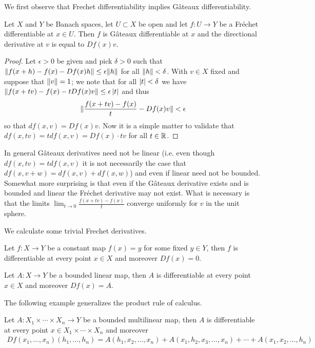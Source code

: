 We first observe that Frechet differentiability implies G\^{a}teaux differentiability.
\begin{prop}\label{FrechetDifferentiableImpliesGateauxDifferentiable}Let $X$ and $Y$ be Banach spaces, let $U \subset X$ be
  open and let $f : U \to Y$ be
  a Fr\'{e}chet differentiable at $x \in U$.  Then $f$ is G\^{a}teaux
  differentiable at $x$ and the directional derivative at $v$ is equal
  to $Df(x)v$.
\end{prop}
\begin{proof}
Let $\epsilon >0$ be given and pick $\delta>0$ such
that $\lVert f(x+h) - f(x) -Df(x)h \rVert \leq \epsilon \lVert h \rVert$ for all
$\lVert h \rVert < \delta$.  With $v \in X$ fixed and suppose that $\lVert v \rVert
= 1$; we note that for all
$\left \vert t \right \vert < \delta$ we have $\lVert f(x+tv) - f(x) - t Df(x) v \rVert
\leq \epsilon \left \vert t \right \vert $ and thus 
\begin{align*}
\lVert \frac{f(x+tv) - f(x) }{t} - Df(x) v \rVert < \epsilon
\end{align*}
so that $df(x,v) = Df(x) v$.  Now it is a simple matter to validate
that $df(x, tv) = t df(x,v) = Df(x) \cdot tv$ for all $t \in \mathbb{R}$.
\end{proof}
In general G\^{a}teaux derivatives need not be linear (i.e. even
though $df(x,tv) = tdf(x,v)$ it is not necessarily the case that
$df(x,v+w) = df(x,v) + df(x,w)$) and even if
linear need not be bounded.  Somewhat more surprising is that even if
the G\^{a}teaux derivative exists and is bounded and linear the
Fr\'{e}chet derivative may not exist.  What is necessary is that the
limits $\lim_{t \to 0} \frac{f(x+tv) -f(x)}{t}$ converge uniformly for
$v$ in the unit sphere.

We calculate some trivial Frechet derivatives.
\begin{examp}Let $f : X \to Y$ be a constant map $f(x) = y$ for some
  fixed $y \in Y$, then $f$ is differentiable at every point $x \in X$
  and moreover $Df(x) = 0$.
\end{examp}
\begin{examp}Let $A : X \to Y$ be a bounded linear map, then $A$ is differentiable at every point $x \in X$
  and moreover $Df(x) = A$.
\end{examp}

The following example generalizes the product rule of calculus.
\begin{examp}Let $A : X_1  \times \dotsm \times X_n \to Y$ be a bounded
  multilinear map, then $A$ is differentiable at every point $x \in
  X_1 \times \dotsm \times X_n$
  and moreover 
\begin{align*}
Df(x_1, \dotsc, x_n)(h_1, \dotsc, h_n) = A(h_1, x_2, \dotsc, x_n) +
  A(x_1, h_2, x_3, \dotsc, x_n) + \dotsm + A(x_1, x_2, \dotsc, h_n)
\end{align*}
\end{examp}

